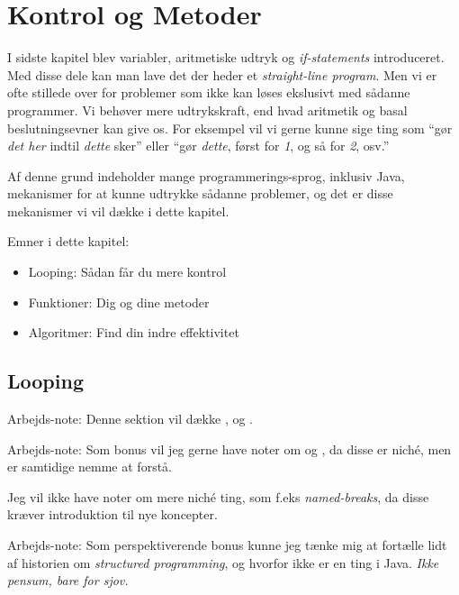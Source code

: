 \chapter{Kontrol og Metoder}

	I sidste kapitel blev variabler, aritmetiske udtryk og \emph{if-statements}
	introduceret. Med disse dele kan man lave det der heder et
	\emph{straight-line program}. Men vi er ofte stillede over for problemer som
	ikke kan løses ekslusivt med sådanne programmer. Vi behøver mere
	udtrykskraft, end hvad aritmetik og basal beslutningsevner kan give os.
	For eksempel vil vi gerne kunne sige ting som ``gør \emph{det her} indtil
	\emph{dette} sker'' eller ``gør \emph{dette}, først for \emph{1}, og så for
	\emph{2}, osv.''

	Af denne grund indeholder mange programmerings-sprog, inklusiv Java,
	mekanismer for at kunne udtrykke sådanne problemer, og det er disse
	mekanismer vi vil dække i dette kapitel.

	Emner i dette kapitel:

	\begin{itemize} %
		\item Looping: Sådan får du mere kontrol
		\item Funktioner: Dig og dine metoder
		\item Algoritmer: Find din indre effektivitet
	\end{itemize}

\section{Looping}

	\begin{remark}  Arbejds-note:
		Denne sektion vil dække ,  og .
	\end{remark}

	\begin{remark}  Arbejds-note:
		Som bonus vil jeg gerne have noter om  og
		, da disse er niché, men er samtidige nemme at
		forstå.

		Jeg vil ikke have noter om mere niché ting, som f.eks
		\emph{named-breaks}, da disse kræver introduktion til nye koncepter.
	\end{remark}

	\begin{remark}  Arbejds-note:
		Som perspektiverende bonus kunne jeg tænke mig at fortælle lidt af
		historien om \emph{structured programming}, og hvorfor 
		ikke er en ting i Java. \emph{Ikke pensum, bare for sjov.}
	\end{remark}

